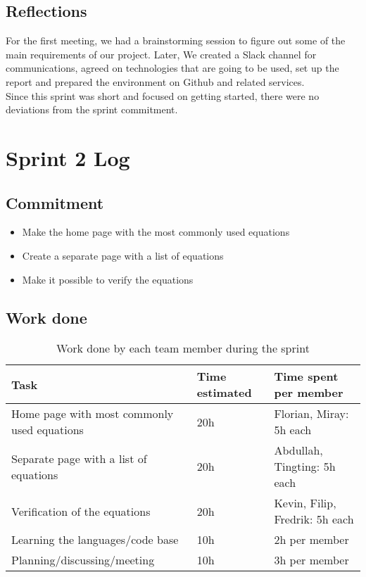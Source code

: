 \documentclass[14]{article}
\begin{document}
\subsection{Reflections}
For the first meeting, we had a brainstorming session to figure out some of the main requirements of our project. Later, We created a Slack channel for communications, agreed on technologies that are going to be used, set up the report and prepared the environment on Github and related services.\\
Since this sprint was short and focused on getting started, there were no deviations from the sprint commitment.

\section{Sprint 2 Log}

\subsection{Commitment}

\begin{itemize}
    \item Make the home page with the most commonly used equations
    \item Create a separate page with a list of equations
    \item Make it possible to verify the equations
\end{itemize}

\subsection{Work done}

\begin{table}[H]
    \centering
    \begin{tabular}{l|l|l|}
        \textbf{Task} & \textbf{Time estimated} & \textbf{Time spent per member}  \\
        \hline
        Home page with most commonly used equations & 20h & Florian, Miray: 5h each \\
        Separate page with a list of equations & 20h & Abdullah, Tingting: 5h each\\
        Verification of the equations & 20h & Kevin, Filip, Fredrik: 5h each \\
        Learning the languages/code base & 10h & 2h per member \\
        Planning/discussing/meeting & 10h & 3h per member \\
        
    \end{tabular}
    \caption{Work done by each team member during the sprint}
    \label{tab:my_label}
\end{table}
\end{document}

